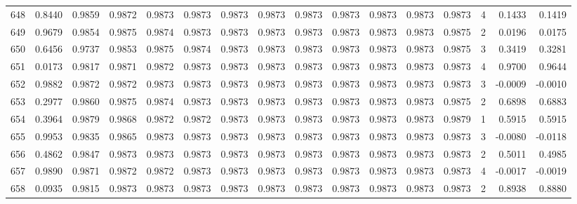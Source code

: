 \begin{tabular}{lrrrrrrrrrrrrrrr}
648 &      0.8440 &  0.9859 &  0.9872 &  0.9873 &  0.9873 &  0.9873 &  0.9873 &  0.9873 &  0.9873 &  0.9873 &   0.9873 &     0.9873 &      4 &                    0.1433 &                     0.1419 \\
649 &      0.9679 &  0.9854 &  0.9875 &  0.9874 &  0.9873 &  0.9873 &  0.9873 &  0.9873 &  0.9873 &  0.9873 &   0.9873 &     0.9875 &      2 &                    0.0196 &                     0.0175 \\
650 &      0.6456 &  0.9737 &  0.9853 &  0.9875 &  0.9874 &  0.9873 &  0.9873 &  0.9873 &  0.9873 &  0.9873 &   0.9873 &     0.9875 &      3 &                    0.3419 &                     0.3281 \\
651 &      0.0173 &  0.9817 &  0.9871 &  0.9872 &  0.9873 &  0.9873 &  0.9873 &  0.9873 &  0.9873 &  0.9873 &   0.9873 &     0.9873 &      4 &                    0.9700 &                     0.9644 \\
652 &      0.9882 &  0.9872 &  0.9872 &  0.9873 &  0.9873 &  0.9873 &  0.9873 &  0.9873 &  0.9873 &  0.9873 &   0.9873 &     0.9873 &      3 &                   -0.0009 &                    -0.0010 \\
653 &      0.2977 &  0.9860 &  0.9875 &  0.9874 &  0.9873 &  0.9873 &  0.9873 &  0.9873 &  0.9873 &  0.9873 &   0.9873 &     0.9875 &      2 &                    0.6898 &                     0.6883 \\
654 &      0.3964 &  0.9879 &  0.9868 &  0.9872 &  0.9872 &  0.9873 &  0.9873 &  0.9873 &  0.9873 &  0.9873 &   0.9873 &     0.9879 &      1 &                    0.5915 &                     0.5915 \\
655 &      0.9953 &  0.9835 &  0.9865 &  0.9873 &  0.9873 &  0.9873 &  0.9873 &  0.9873 &  0.9873 &  0.9873 &   0.9873 &     0.9873 &      3 &                   -0.0080 &                    -0.0118 \\
656 &      0.4862 &  0.9847 &  0.9873 &  0.9873 &  0.9873 &  0.9873 &  0.9873 &  0.9873 &  0.9873 &  0.9873 &   0.9873 &     0.9873 &      2 &                    0.5011 &                     0.4985 \\
657 &      0.9890 &  0.9871 &  0.9872 &  0.9872 &  0.9873 &  0.9873 &  0.9873 &  0.9873 &  0.9873 &  0.9873 &   0.9873 &     0.9873 &      4 &                   -0.0017 &                    -0.0019 \\
658 &      0.0935 &  0.9815 &  0.9873 &  0.9873 &  0.9873 &  0.9873 &  0.9873 &  0.9873 &  0.9873 &  0.9873 &   0.9873 &     0.9873 &      2 &                    0.8938 &                     0.8880 \\

\end{tabular}
